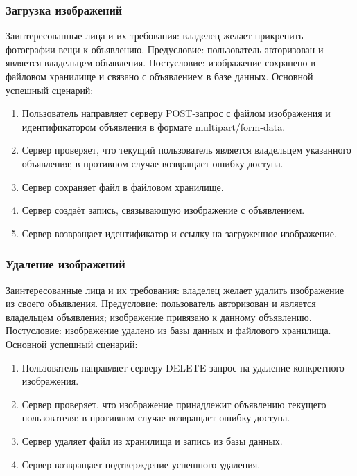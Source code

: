 \subsubsection{Загрузка изображений}
Заинтересованные лица и их требования: владелец желает прикрепить фотографии вещи к объявлению.
Предусловие: пользователь авторизован и является владельцем объявления.
Постусловие: изображение сохранено в файловом хранилище и связано с объявлением в базе данных.
Основной успешный сценарий:
\begin{enumerate}
\item Пользователь направляет серверу POST-запрос с файлом изображения и идентификатором объявления в формате multipart/form-data.
\item Сервер проверяет, что текущий пользователь является владельцем указанного объявления; в противном случае возвращает ошибку доступа.
\item Сервер сохраняет файл в файловом хранилище.
\item Сервер создаёт запись, связывающую изображение с объявлением.
\item Сервер возвращает идентификатор и ссылку на загруженное изображение.
\end{enumerate}

\subsubsection{Удаление изображений}
Заинтересованные лица и их требования: владелец желает удалить изображение из своего объявления.
Предусловие: пользователь авторизован и является владельцем объявления; изображение привязано к данному объявлению.
Постусловие: изображение удалено из базы данных и файлового хранилища.
Основной успешный сценарий:
\begin{enumerate}
\item Пользователь направляет серверу DELETE-запрос на удаление конкретного изображения.
\item Сервер проверяет, что изображение принадлежит объявлению текущего пользователя; в противном случае возвращает ошибку доступа.
\item Сервер удаляет файл из хранилища и запись из базы данных.
\item Сервер возвращает подтверждение успешного удаления.
\end{enumerate}

